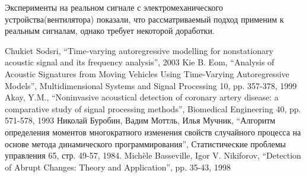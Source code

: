 \documentclass[12pt,a4paper]{article}
\begin{document}
Эксперименты на реальном сигнале с электромеханического устройства(вентилятора) показали, что рассматриваемый подход применим к реальным сигналам, однако требует некоторой доработки.

\begin{thebibliography}{99}
 Chukiet Sodsri, ``Time-varying autoregressive modelling for nonstationary acoustic signal and its frequency analysis'', 2003
 Kie B. Eom, ``Analysis of Acoustic Signatures from Moving Vehicles Using Time-Varying Autoregressive Models'', Multidimensional Systems and Signal Processing 10, pp. 357-378, 1999
 Akay, Y.M., ``Noninvasive acoustical detection of coronary artery disease: a comparative study of signal processing methods'', Biomedical Engineering 40, pp. 571-578, 1993
 Николай Буробин, Вадим Моттль, Илья Мучник, ``Алгоритм определения моментов многократного изменения свойств случайного процесса на основе метода динамического программирования'', Статистические проблемы управления 65, стр. 49-57, 1984.
 Mich\`{e}le Basseville, Igor V. Nikiforov, ``Detection of Abrupt Changes: Theory and Application'', pp. 35-43, 1998
\end{thebibliography}
\end{document}
